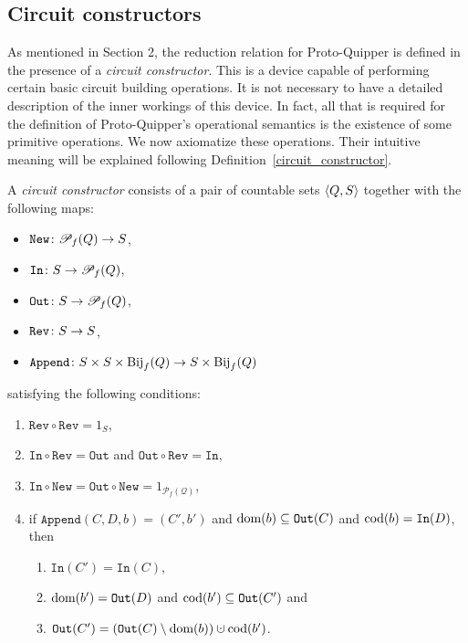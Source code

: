 \documentclass[twoside]{article}
\begin{document}
\subsection{Circuit constructors}\label{ssec-circuit-cons}

As mentioned in Section 2, the reduction relation for Proto-Quipper is
defined in the presence of a \emph{circuit constructor}. This is a
device capable of performing certain basic circuit building
operations. It is not necessary to have a detailed description of the
inner workings of this device. In fact, all that is required for the
definition of Proto-Quipper's operational semantics is the existence
of some primitive operations. We now axiomatize these
operations. Their intuitive meaning will be explained following
Definition~\ref{circuit_constructor}.

\begin{definition}
\label{circuit_constructor}
A \emph{circuit constructor} consists of a pair of countable sets $\langle Q,S\rangle$ 
together with the following maps:
\begin{itemize}
  \item $\mathtt{New}\colon {\mathscr{P}}_f(Q) \to S$,
  \item $\mathtt{In}\colon S\to {\mathscr{P}}_f(Q)$,
  \item $\mathtt{Out}\colon S\to {\mathscr{P}}_f(Q)$,
  \item $\mathtt{Rev}\colon S \to S$,
  \item $\mathtt{Append}\colon S\times S\times \textrm{\rm Bij}_f(Q) \to S \times \textrm{\rm Bij}_f(Q)$
\end{itemize}
satisfying the following conditions:
\begin{enumerate}
  \item $\mathtt{Rev}\circ\mathtt{Rev}=1_S$,
  \item $\mathtt{In}\circ\mathtt{Rev}= \mathtt{Out}$ and 
        $\mathtt{Out}\circ\mathtt{Rev}= \mathtt{In}$\label{in_out_rev},
  \item $\mathtt{In}\circ\mathtt{New} = \mathtt{Out}\circ\mathtt{New} =
    1_{\mathcal{P}_f(\mathcal{Q})}$,
  \item if $\mathtt{Append} (C,D,b)=(C',b')$ and
    $\mathop{\textrm{\rm dom}}\nolimits(b)\subseteq\mathtt{Out}(C)$ and $\mathop{\textrm{\rm cod}}\nolimits(b)=\mathtt{In}(D)$,
    then \label{Append_cond_x}
    \begin{enumerate}
      \item $\mathtt{In}(C') = \mathtt{In}(C)$,\label{Append_cond_2b}    
      \item $\mathop{\textrm{\rm dom}}\nolimits(b')=\mathtt{Out}(D)$ and $\mathop{\textrm{\rm cod}}\nolimits(b')\subseteq\mathtt{Out}(C')$ and\label{Append_cond_2}
      \item $\mathtt{Out}(C')=
      (\mathtt{Out}(C)\setminus \dom(b))\cupdot\cod(b')$.\label{Append_cond_3}
    \end{enumerate}
\end{enumerate}
\end{definition}
\end{document}
